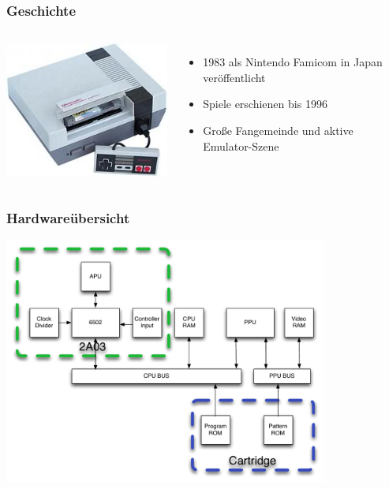 \documentclass{beamer}
\begin{document}
    \begin{frame}
        \frametitle{Geschichte}
        \begin{columns}
                \includegraphics[width=1.1\textwidth]{img/nes.jpg}
                
             
                \begin{itemize}
                    \item{1983 als Nintendo Famicom in Japan veröffentlicht}
                    \item{Spiele erschienen bis 1996}
                    \item{Große Fangemeinde und aktive Emulator-Szene}
                \end{itemize}
        \end{columns}
    \end{frame}
    
    
    \begin{frame}
        \frametitle{Hardwareübersicht}
        \includegraphics[width=0.8\textwidth]{img/system1.pdf}
    \end{frame}
    
\end{document}

